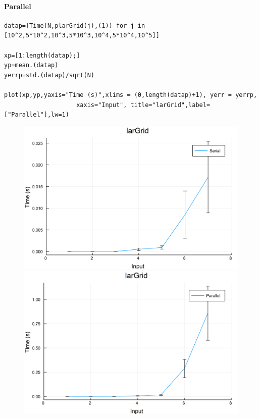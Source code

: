 \documentclass{article}
\begin{document}
\paragraph{Parallel}
\begin{flushleft}\small
\begin{list}{}{} \item
    \begin{Verbatim}[tabsize=4]
datap=[Time(N,plarGrid(j),(1)) for j in [10^2,5*10^2,10^3,5*10^3,10^4,5*10^4,10^5]]

xp=[1:length(datap);]
yp=mean.(datap)
yerrp=std.(datap)/sqrt(N)

plot(xp,yp,yaxis="Time (s)",xlims = (0,length(datap)+1), yerr = yerrp,
                    xaxis="Input", title="larGrid",label=["Parallel"],lw=1)
    \end{Verbatim}
\end{list}
\end{flushleft}  

\begin{figure}[h!]
\centering
\includegraphics[scale=0.06]{larGridSer.png}
\includegraphics[scale=0.06]{larGridPar.png}
\end{figure}
\end{document}
